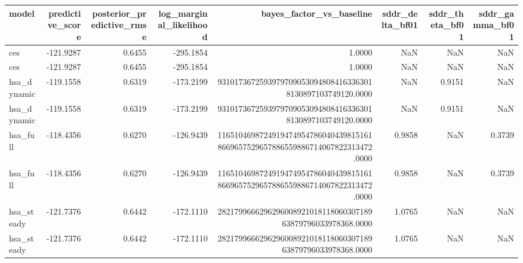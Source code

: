 \begin{tabular}{lrrrrrrr}
\toprule
model & predictive\_score & posterior\_predictive\_rmse & log\_marginal\_likelihood & bayes\_factor\_vs\_baseline & sddr\_delta\_bf01 & sddr\_theta\_bf01 & sddr\_gamma\_bf01 \\
\midrule
ces & -121.9287 & 0.6455 & -295.1854 & 1.0000 & NaN & NaN & NaN \\
ces & -121.9287 & 0.6455 & -295.1854 & 1.0000 & NaN & NaN & NaN \\
hsa\_dynamic & -119.1558 & 0.6319 & -173.2199 & 93101736725939797090530948084163363018130897103749120.0000 & NaN & 0.9151 & NaN \\
hsa\_dynamic & -119.1558 & 0.6319 & -173.2199 & 93101736725939797090530948084163363018130897103749120.0000 & NaN & 0.9151 & NaN \\
hsa\_full & -118.4356 & 0.6270 & -126.9439 & 11651046987249194749547860404398151618669657529657886559886714067822313472.0000 & 0.9858 & NaN & 0.3739 \\
hsa\_full & -118.4356 & 0.6270 & -126.9439 & 11651046987249194749547860404398151618669657529657886559886714067822313472.0000 & 0.9858 & NaN & 0.3739 \\
hsa\_steady & -121.7376 & 0.6442 & -172.1110 & 282179966629629600892101811806030718963879796033978368.0000 & 1.0765 & NaN & NaN \\
hsa\_steady & -121.7376 & 0.6442 & -172.1110 & 282179966629629600892101811806030718963879796033978368.0000 & 1.0765 & NaN & NaN \\
\bottomrule
\end{tabular}
